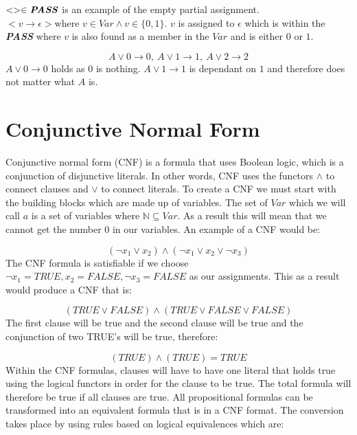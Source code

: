 \documentclass[11pt,a4paper, notitlepage]{report}
\begin{document}
$<> \in \textbf{\textit{PASS}}$ is an example of the empty partial assignment.
$< v \rightarrow \epsilon > \text{where } v \in Var \land v \in \{0,1\}$. $v$ is assigned to $\epsilon$ which is within the \textbf{\textit{PASS}} where $v$ is also found as a member in the $Var$ and is either $0$ or $1$.

\begin{displaymath}
A \lor 0 \rightarrow 0, \: A \lor 1 \rightarrow 1, \: A \lor 2 \rightarrow 2
\end{displaymath}
$A \lor 0 \rightarrow 0$ holds as $0$ is nothing. $A \lor 1 \rightarrow 1$ is dependant on $1$ and therefore does not matter what $A$ is.

\section{Conjunctive Normal Form}
\label{sec:CNF}

Conjunctive normal form (CNF) is a formula that uses Boolean logic, which is a conjunction of disjunctive literals. In other words, CNF uses the functors $\land$ to connect clauses and $\lor$ to connect literals.
To create a CNF we must start with the building blocks which are made up of variables. The set of $Var$ which we will call $a$ is a set of variables where $\mathbb{N} \subseteq Var$. As a result this will mean that we cannot get the number $0$ in our variables.
An example of a CNF would be:

\begin{displaymath}
(\neg x _1 \lor x _2) \land (\neg x _1 \lor x _2 \lor \neg x _3)
\end{displaymath}
The CNF formula is satisfiable if we choose $\neg x_1 = TRUE, x _2 = FALSE, \neg x_3 = FALSE$ as our assignments. This as a result would produce a CNF that is:

\begin{displaymath}
(TRUE \lor FALSE) \land (TRUE \lor FALSE \lor FALSE)
\end{displaymath}
The first clause will be true and the second clause will be true and the conjunction of two TRUE's will be true, therefore:

\begin{displaymath}
(TRUE) \land (TRUE) = TRUE
\end{displaymath}
Within the CNF formulas, clauses will have to have one literal that holds true using the logical functors in order for the clause to be true. The total formula will therefore be true if all clauses are true.
All propositional formulas can be transformed into an equivalent formula that is in a CNF format. The conversion takes place by using rules based on logical equivalences which are:
\end{document}
